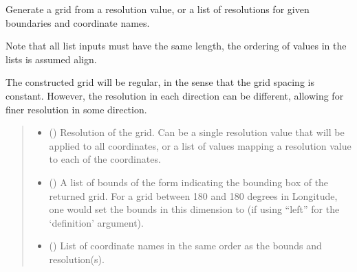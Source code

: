 \documentclass[letterpaper,10pt,english]{sphinxmanual}
\begin{document}
\begin{fulllineitems}
\label{\detokenize{covariance:glomar_gridding.grid.grid_from_resolution}}
\pysigstartsignatures
\pysiglinewithargsret
{}
{\sphinxparamcomma {}\sphinxparamcomma {}\sphinxparamcomma {}}
{}
\pysigstopsignatures
\sphinxAtStartPar
Generate a grid from a resolution value, or a list of resolutions for
given boundaries and coordinate names.

\sphinxAtStartPar
Note that all list inputs must have the same length, the ordering of values
in the lists is assumed align.

\sphinxAtStartPar
The constructed grid will be regular, in the sense that the grid spacing is
constant. However, the resolution in each direction can be different,
allowing for finer resolution in some direction.
\begin{quote}\begin{description}
\begin{itemize}
\item {}
\sphinxAtStartPar
{} () \textendash{} Resolution of the grid. Can be a single resolution value that will be
applied to all coordinates, or a list of values mapping a resolution
value to each of the coordinates.

\item {}
\sphinxAtStartPar
{} () \textendash{} A list of bounds of the form  indicating
the bounding box of the returned grid. For a grid between \sphinxhyphen{}180 and 180
degrees in Longitude, one would set the bounds in this dimension to
 (if using “left” for the ‘definition’ argument).

\item {}
\sphinxAtStartPar
{} () \textendash{} List of coordinate names in the same order as the bounds and
resolution(s).


\end{itemize}
\end{description}
\end{quote}
\end{fulllineitems}
\end{document}
